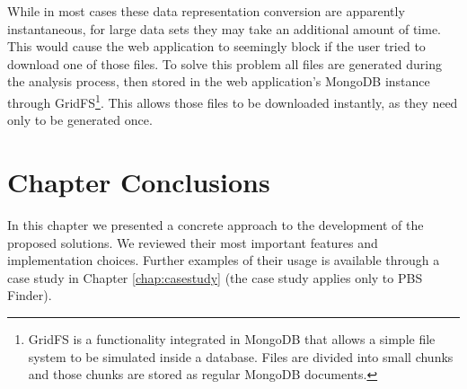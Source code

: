 While in most cases these data representation conversion are apparently
instantaneous, for large data sets they may take an additional amount of time.
This would cause the web application to seemingly block if the user tried to
download one of those files. To solve this problem all files are generated
during the analysis process, then stored in the web application's MongoDB
instance through GridFS\footnote{GridFS is a functionality integrated in MongoDB
that allows a simple file system to be simulated inside a database. Files are
divided into small chunks and those chunks are stored as regular MongoDB
documents.}. This allows those files to be downloaded instantly, as they need
only to be generated once.



\section{Chapter Conclusions}


In this chapter we presented a concrete approach to the development of the
proposed solutions. We reviewed their most important features and implementation
choices. Further examples of their usage is available through a case study in
Chapter \ref{chap:casestudy} (the case study applies only to PBS Finder).
